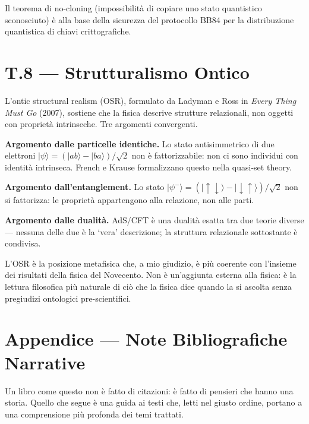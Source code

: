 \documentclass[12pt,a4paper,openany]{book}
\begin{document}
Il teorema di no-cloning (impossibilità di copiare uno stato quantistico sconosciuto) è alla base della sicurezza del protocollo BB84 per la distribuzione quantistica di chiavi crittografiche.

\chapter*{T.8 — Strutturalismo Ontico}

L'ontic structural realism (OSR), formulato da Ladyman e Ross in \textit{Every Thing Must Go} (2007), sostiene che la fisica descrive strutture relazionali, non oggetti con proprietà intrinseche. Tre argomenti convergenti.

\textbf{Argomento dalle particelle identiche.} Lo stato antisimmetrico di due elettroni $|\psi\rangle = (|ab\rangle - |ba\rangle)/\sqrt{2}$ non è fattorizzabile: non ci sono individui con identità intrinseca. French e Krause formalizzano questo nella quasi-set theory.

\textbf{Argomento dall'entanglement.} Lo stato $|\psi^-\rangle = (|\!\uparrow\downarrow\rangle - |\!\downarrow\uparrow\rangle)/\sqrt{2}$ non si fattorizza: le proprietà appartengono alla relazione, non alle parti.

\textbf{Argomento dalle dualità.} AdS/CFT è una dualità esatta tra due teorie diverse — nessuna delle due è la `vera' descrizione; la struttura relazionale sottostante è condivisa.

\medskip

L'OSR è la posizione metafisica che, a mio giudizio, è più coerente con l'insieme dei risultati della fisica del Novecento. Non è un'aggiunta esterna alla fisica: è la lettura filosofica più naturale di ciò che la fisica dice quando la si ascolta senza pregiudizi ontologici pre-scientifici.

\chapter*{Appendice — Note Bibliografiche Narrative}

Un libro come questo non è fatto di citazioni: è fatto di pensieri che hanno una storia. Quello che segue è una guida ai testi che, letti nel giusto ordine, portano a una comprensione più profonda dei temi trattati.
\end{document}
